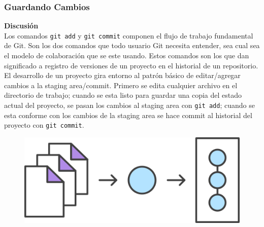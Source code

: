 \documentclass[8pt]{beamer}
\begin{document}
\begin{frame}
\frametitle{Guardando Cambios}
\textbf{Discusi\'on}\\
\medskip
Los comandos \texttt{git add} y \texttt{git commit} componen el flujo de trabajo fundamental de Git. Son los dos comandos que todo usuario Git necesita entender, sea cual sea el modelo de colaboraci\'on que se este usando. Estos comandos son los que dan significado a registro de versiones de un proyecto en el historial de un repositorio. El desarrollo de un proyecto gira entorno al patr\'on b\'asico de editar/agregar cambios a la staging area/commit. Primero se edita cualquier archivo en el directorio de trabajo; cuando se esta listo para guardar una copia del estado actual del proyecto, se pasan los cambios al staging area con \texttt{git add}; cuando se esta conforme con los cambios de la staging area se hace commit al historial del proyecto con \texttt{git commit}.\\
\medskip
\begin{figure}
  \centering
  \includegraphics[scale=0.4]{imagenes/04.png}
\end{figure}

\end{frame}

\end{document}

